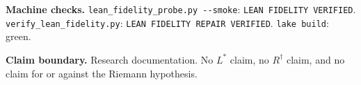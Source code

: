 \documentclass[10pt]{article}
\newcommand{\code}[1]{\nolinkurl{#1}}
\begin{document}
\medskip\noindent
\textbf{Machine checks.}\enspace
\code{lean_fidelity_probe.py --smoke}: \code{LEAN FIDELITY VERIFIED}.
\code{verify_lean_fidelity.py}: \code{LEAN FIDELITY REPAIR VERIFIED}.
\code{lake build}: green.

\medskip\noindent
\textbf{Claim boundary.}\enspace
Research documentation.  No $L^*$ claim, no $R^\dagger$ claim, and no
claim for or against the Riemann hypothesis.
\end{document}

